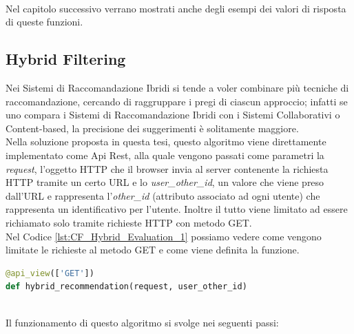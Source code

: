 \ \\
Nel capitolo successivo verrano mostrati anche degli esempi dei valori di risposta di queste funzioni.

\subsection{Hybrid Filtering} 
Nei Sistemi di Raccomandazione Ibridi si tende a voler combinare più tecniche di raccomandazione, cercando di raggruppare i 
pregi di ciascun approccio; infatti se uno compara i Sistemi di Raccomandazione Ibridi con i Sistemi Collaborativi o 
Content-based, la precisione dei suggerimenti è solitamente maggiore.\\
Nella soluzione proposta in questa tesi, questo algoritmo viene direttamente implementato come Api Rest, alla quale vengono 
passati come parametri la \textit{request}, l'oggetto HTTP che il browser invia al server contenente la richiesta HTTP tramite
un certo URL e lo \textit{user\_other\_id}, un valore che viene preso dall'URL e rappresenta l'\textit{other\_id} (attributo
associato ad ogni utente) che rappresenta un identificativo per l'utente. Inoltre il tutto viene limitato ad essere richiamato 
solo tramite richieste HTTP con metodo GET.\\ 
Nel Codice \ref{lst:CF_Hybrid_Evaluation_1} possiamo vedere come vengono limitate le richieste al metodo GET e come 
viene definita la funzione.
\begin{lstlisting}[language=Python, label=lst:CF_Hybrid_Evaluation_1, caption={\ }]
@api_view(['GET'])
def hybrid_recommendation(request, user_other_id)
\end{lstlisting} 
\ \\
Il funzionamento di questo algoritmo si svolge nei seguenti passi:
